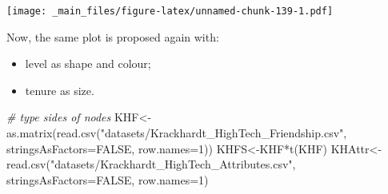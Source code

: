 \documentclass[
  notitlepage,
  onecolumn,
  openany]{book}
\newenvironment{Shaded}{\begin{snugshade}}{\end{snugshade}}
\newcommand{\AttributeTok}[1]{\textcolor[rgb]{0.77,0.63,0.00}{#1}}
\newcommand{\CommentTok}[1]{\textcolor[rgb]{0.56,0.35,0.01}{\textit{#1}}}
\newcommand{\ConstantTok}[1]{\textcolor[rgb]{0.00,0.00,0.00}{#1}}
\newcommand{\DecValTok}[1]{\textcolor[rgb]{0.00,0.00,0.81}{#1}}
\newcommand{\FunctionTok}[1]{\textcolor[rgb]{0.00,0.00,0.00}{#1}}
\newcommand{\NormalTok}[1]{#1}
\newcommand{\OtherTok}[1]{\textcolor[rgb]{0.56,0.35,0.01}{#1}}
\newcommand{\SpecialCharTok}[1]{\textcolor[rgb]{0.00,0.00,0.00}{#1}}
\newcommand{\StringTok}[1]{\textcolor[rgb]{0.31,0.60,0.02}{#1}}
\providecommand{\tightlist}{%
  \setlength{\itemsep}{0pt}\setlength{\parskip}{0pt}}
\begin{document}
\texttt{[image: \_main\_files/figure-latex/unnamed-chunk-139-1.pdf]}

Now, the same plot is proposed again with:

\begin{itemize}
\tightlist
\item
  level as shape and colour;
\item
  tenure as size.
\end{itemize}

\begin{Shaded}
\begin{Highlighting}[]
\CommentTok{\# type sides of nodes}
\NormalTok{KHF}\OtherTok{\textless{}{-}}\FunctionTok{as.matrix}\NormalTok{(}\FunctionTok{read.csv}\NormalTok{(}\StringTok{"datasets/Krackhardt\_HighTech\_Friendship.csv"}\NormalTok{,}
                        \AttributeTok{stringsAsFactors=}\ConstantTok{FALSE}\NormalTok{, }\AttributeTok{row.names=}\DecValTok{1}\NormalTok{))}
\NormalTok{KHFS}\OtherTok{\textless{}{-}}\NormalTok{KHF}\SpecialCharTok{*}\FunctionTok{t}\NormalTok{(KHF)}
\NormalTok{KHAttr}\OtherTok{\textless{}{-}}\FunctionTok{read.csv}\NormalTok{(}\StringTok{"datasets/Krackhardt\_HighTech\_Attributes.csv"}\NormalTok{,}
                 \AttributeTok{stringsAsFactors=}\ConstantTok{FALSE}\NormalTok{, }\AttributeTok{row.names=}\DecValTok{1}\NormalTok{)}


\end{Highlighting}
\end{Shaded}
\end{document}
